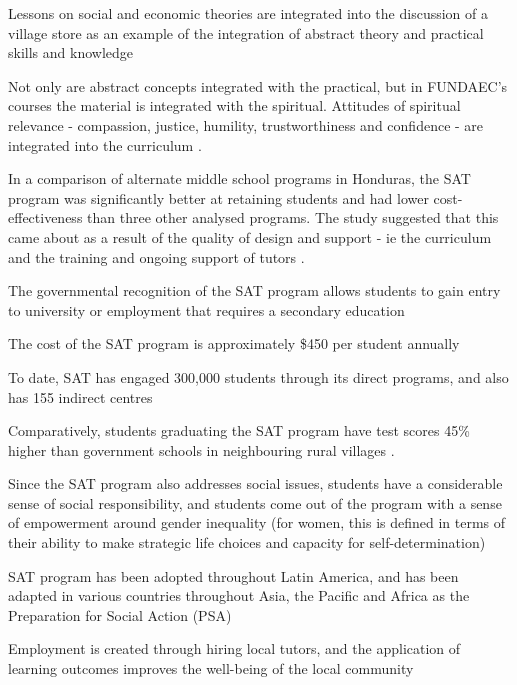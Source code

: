 Lessons on social and economic theories are integrated into the discussion of a village store as an example of the integration of abstract theory and practical skills and knowledge \citep{Arbab1988}

Not only are abstract concepts integrated with the practical, but in FUNDAEC's courses the material is integrated with the spiritual. Attitudes of spiritual relevance - compassion, justice, humility, trustworthiness and confidence - are integrated into the curriculum \citep{Arbab1988}. %


In a comparison of alternate middle school programs in Honduras, the SAT program was significantly better at retaining students and had lower cost-effectiveness than three other analysed programs. The study suggested that this came about as a result of the quality of design and support - ie the curriculum and the training and ongoing support of tutors \citep{Marshall2014}. 




The governmental recognition of the SAT program allows students to gain entry to university or employment that requires a secondary education \citep{Kwauk2016}

The cost of the SAT program is approximately \$450 per student annually \citep{Kwauk2016}

To date, SAT has engaged 300,000 students through its direct programs, and also has 155 indirect centres \citep{Kwauk2016}

Comparatively, students graduating the SAT program have test scores 45\% higher than government schools in neighbouring rural villages \citep{Kwauk2016}.

Since the SAT program also addresses social issues, students have a considerable sense of social responsibility, and students come out of the program with a sense of empowerment around gender inequality (for women, this is defined in terms of their ability to make strategic life choices and capacity for self-determination) \citep{Kwauk2016}

SAT program has been adopted throughout Latin America, and has been adapted in various countries throughout Asia, the Pacific and Africa as the Preparation for Social Action (PSA) \citep{Kwauk2016}

Employment is created through hiring local tutors, and the application of learning outcomes improves the well-being of the local community \citep{Kwauk2016}

